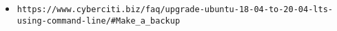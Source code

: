 
\begin{itemize}
\item \verb|https://www.cyberciti.biz/faq/upgrade-ubuntu-18-04-to-20-04-lts-using-command-line/#Make_a_backup|
\end{itemize}
